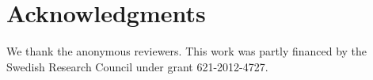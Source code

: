 {%



\section*{Acknowledgments}
We thank the anonymous reviewers. This work was partly financed by the Swedish Research Council under grant 621-2012-4727.

{\raggedright
\printbibliography[segment=\therefsegment,heading=subbibliography]
}

}
